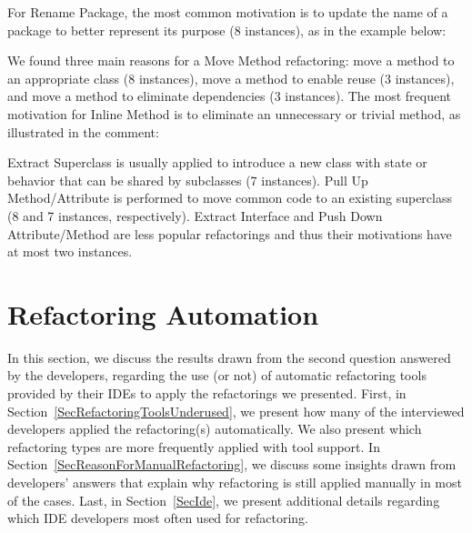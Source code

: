 For {\textsc Rename Package}, the most common motivation is to update the name of a package to better represent its purpose (8 instances), as in the example below:\margin

\margin

We found three main reasons for a {\textsc Move Method} refactoring: move a method to an appropriate 
class (8 instances), move a method to enable reuse (3 instances), and move a method to eliminate 
dependencies (3 instances). 
The most frequent motivation for {\textsc Inline Method} is to eliminate 
an unnecessary or trivial method, as illustrated in the comment:\margin

\margin

{\textsc Extract Superclass} is usually applied to introduce a new class with state or behavior that can be
shared by subclasses (7 instances).
{\textsc Pull Up Method/Attribute} is performed to move common code to an existing superclass (8 and 7 instances, 
respectively). {\textsc Extract Interface} and {\textsc Push Down Attribute/Method} are 
less popular refactorings and thus their motivations have at most two instances.












\section{Refactoring Automation}
\label{SecAutomatedRefactoring}

In this section, we discuss the results drawn from the second question answered by the developers, regarding the 
use (or not) of automatic refactoring tools provided by their IDEs to apply the refactorings we presented. 
First, in Section~\ref{SecRefactoringToolsUnderused}, we present how many of the interviewed developers applied the
refactoring(s) automatically. We also present which refactoring types are more frequently applied with tool support.
In Section~\ref{SecReasonForManualRefactoring}, we discuss some insights drawn from developers' answers that explain
why refactoring is still applied manually in most of the cases.
Last, in Section~\ref{SecIde}, we present additional details regarding which IDE developers most often used
for refactoring.



